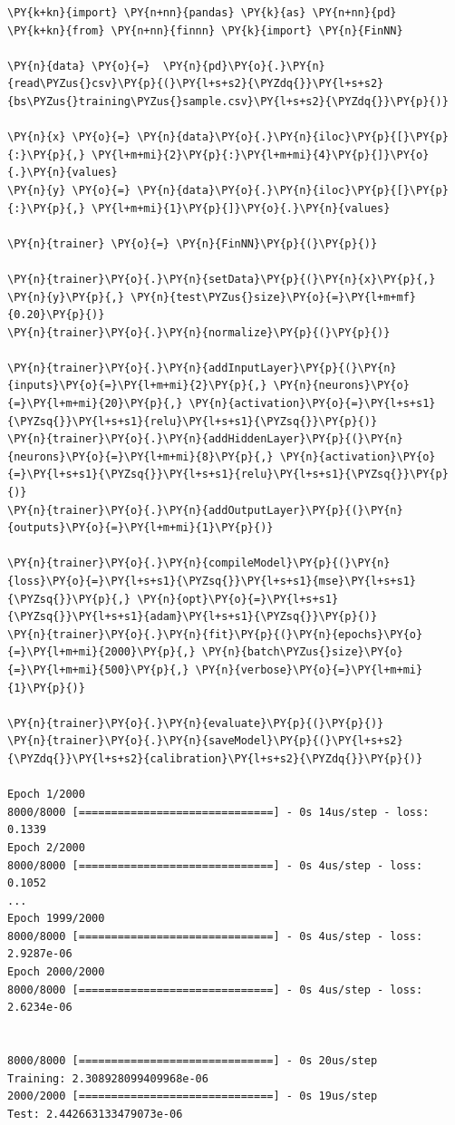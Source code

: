 \begin{tcolorbox}[breakable, size=fbox, boxrule=1pt, pad at break*=1mm,colback=cellbackground, colframe=cellborder]
\begin{Verbatim}[commandchars=\\\{\}]
\PY{k+kn}{import} \PY{n+nn}{pandas} \PY{k}{as} \PY{n+nn}{pd}
\PY{k+kn}{from} \PY{n+nn}{finnn} \PY{k}{import} \PY{n}{FinNN}
	
\PY{n}{data} \PY{o}{=}  \PY{n}{pd}\PY{o}{.}\PY{n}{read\PYZus{}csv}\PY{p}{(}\PY{l+s+s2}{\PYZdq{}}\PY{l+s+s2}{bs\PYZus{}training\PYZus{}sample.csv}\PY{l+s+s2}{\PYZdq{}}\PY{p}{)}
	
\PY{n}{x} \PY{o}{=} \PY{n}{data}\PY{o}{.}\PY{n}{iloc}\PY{p}{[}\PY{p}{:}\PY{p}{,} \PY{l+m+mi}{2}\PY{p}{:}\PY{l+m+mi}{4}\PY{p}{]}\PY{o}{.}\PY{n}{values}
\PY{n}{y} \PY{o}{=} \PY{n}{data}\PY{o}{.}\PY{n}{iloc}\PY{p}{[}\PY{p}{:}\PY{p}{,} \PY{l+m+mi}{1}\PY{p}{]}\PY{o}{.}\PY{n}{values}

\PY{n}{trainer} \PY{o}{=} \PY{n}{FinNN}\PY{p}{(}\PY{p}{)}
	
\PY{n}{trainer}\PY{o}{.}\PY{n}{setData}\PY{p}{(}\PY{n}{x}\PY{p}{,} \PY{n}{y}\PY{p}{,} \PY{n}{test\PYZus{}size}\PY{o}{=}\PY{l+m+mf}{0.20}\PY{p}{)}
\PY{n}{trainer}\PY{o}{.}\PY{n}{normalize}\PY{p}{(}\PY{p}{)}
	
\PY{n}{trainer}\PY{o}{.}\PY{n}{addInputLayer}\PY{p}{(}\PY{n}{inputs}\PY{o}{=}\PY{l+m+mi}{2}\PY{p}{,} \PY{n}{neurons}\PY{o}{=}\PY{l+m+mi}{20}\PY{p}{,} \PY{n}{activation}\PY{o}{=}\PY{l+s+s1}{\PYZsq{}}\PY{l+s+s1}{relu}\PY{l+s+s1}{\PYZsq{}}\PY{p}{)}
\PY{n}{trainer}\PY{o}{.}\PY{n}{addHiddenLayer}\PY{p}{(}\PY{n}{neurons}\PY{o}{=}\PY{l+m+mi}{8}\PY{p}{,} \PY{n}{activation}\PY{o}{=}\PY{l+s+s1}{\PYZsq{}}\PY{l+s+s1}{relu}\PY{l+s+s1}{\PYZsq{}}\PY{p}{)}
\PY{n}{trainer}\PY{o}{.}\PY{n}{addOutputLayer}\PY{p}{(}\PY{n}{outputs}\PY{o}{=}\PY{l+m+mi}{1}\PY{p}{)}
	
\PY{n}{trainer}\PY{o}{.}\PY{n}{compileModel}\PY{p}{(}\PY{n}{loss}\PY{o}{=}\PY{l+s+s1}{\PYZsq{}}\PY{l+s+s1}{mse}\PY{l+s+s1}{\PYZsq{}}\PY{p}{,} \PY{n}{opt}\PY{o}{=}\PY{l+s+s1}{\PYZsq{}}\PY{l+s+s1}{adam}\PY{l+s+s1}{\PYZsq{}}\PY{p}{)}
\PY{n}{trainer}\PY{o}{.}\PY{n}{fit}\PY{p}{(}\PY{n}{epochs}\PY{o}{=}\PY{l+m+mi}{2000}\PY{p}{,} \PY{n}{batch\PYZus{}size}\PY{o}{=}\PY{l+m+mi}{500}\PY{p}{,} \PY{n}{verbose}\PY{o}{=}\PY{l+m+mi}{1}\PY{p}{)}
	
\PY{n}{trainer}\PY{o}{.}\PY{n}{evaluate}\PY{p}{(}\PY{p}{)}
\PY{n}{trainer}\PY{o}{.}\PY{n}{saveModel}\PY{p}{(}\PY{l+s+s2}{\PYZdq{}}\PY{l+s+s2}{calibration}\PY{l+s+s2}{\PYZdq{}}\PY{p}{)}

Epoch 1/2000
8000/8000 [==============================] - 0s 14us/step - loss: 0.1339
Epoch 2/2000
8000/8000 [==============================] - 0s 4us/step - loss: 0.1052
...
Epoch 1999/2000
8000/8000 [==============================] - 0s 4us/step - loss: 2.9287e-06
Epoch 2000/2000
8000/8000 [==============================] - 0s 4us/step - loss: 2.6234e-06


8000/8000 [==============================] - 0s 20us/step
Training: 2.308928099409968e-06
2000/2000 [==============================] - 0s 19us/step
Test: 2.442663133479073e-06
\end{Verbatim}
\end{tcolorbox}

